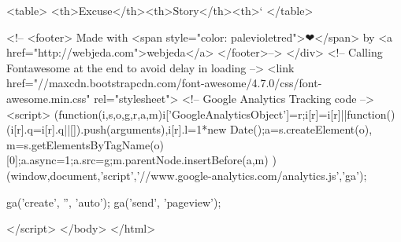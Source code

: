 <table>
<th>Excuse</th><th>Story</th><th>`
</table>


  
<!--    <footer>
      Made with <span style="color: palevioletred">❤</span> by <a href="http://webjeda.com">webjeda</a>
</footer>-->
</div>
  <!-- Calling Fontawesome at the end to avoid delay in loading --> 
  <link href="//maxcdn.bootstrapcdn.com/font-awesome/4.7.0/css/font-awesome.min.css" rel="stylesheet">
<!-- Google Analytics Tracking code -->
<script>
  (function(i,s,o,g,r,a,m){i['GoogleAnalyticsObject']=r;i[r]=i[r]||function(){
  (i[r].q=i[r].q||[]).push(arguments)},i[r].l=1*new Date();a=s.createElement(o),
  m=s.getElementsByTagName(o)[0];a.async=1;a.src=g;m.parentNode.insertBefore(a,m)
  })(window,document,'script','//www.google-analytics.com/analytics.js','ga');

  ga('create', '', 'auto');
  ga('send', 'pageview');

</script>
</body>
</html>
